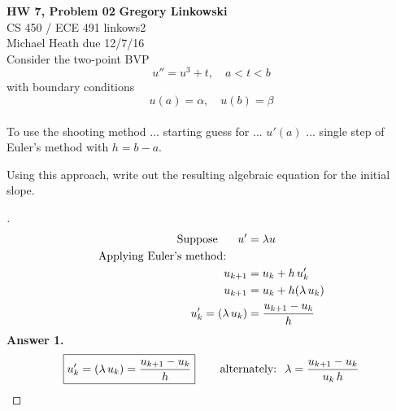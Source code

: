 \documentclass[12pt]{article}
\newenvironment{exercise}[2][Exercise]{\begin{trivlist}
\item[\hskip \labelsep {\bfseries #1}\hskip \labelsep {\bfseries #2.}]}{\end{trivlist}}
\begin{document}
\noindent
\large\textbf{HW 7, Problem 02} \hfill \textbf{Gregory Linkowski} \\
\normalsize CS 450 / ECE 491 \hfill linkows2 \\
Michael Heath \hfill due 12/7/16 \\


\vspace{5mm}
Consider the two-point BVP
\[ u'' = u^3 + t, \quad a < t < b \]
with boundary conditions
\[ u(a) = \alpha, \quad u(b) = \beta \] \\
To use the shooting method ... starting guess for ... $u'(a)$ ... single step of Euler's method with $h = b - a$.
\vspace{-2mm} \\

\vspace{5mm}
\begin{exercise}{1}
	Using this approach, write out the resulting algebraic equation for the initial slope.
\end{exercise} \vspace{-10mm}
\begin{proof}[]
	\begin{align*}
		\textnormal{Suppose \hspace{5mm}} u' &= \lambda u \\
		\textnormal{Applying Euler's method: \hspace{5mm}} & \\
		u_{k+1} &= u_k + h \, u_k'\\
		u_{k+1} &= u_k + h(\lambda \, u_k) \\
		u_k' = (\lambda \, u_k) &= \frac{u_{k+1} - u_k}{h} \\
	\end{align*}
	\textbf{Answer 1.} \vspace{-7mm} \\
		\[ \boxed{u_k' = (\lambda \, u_k) = \frac{u_{k+1} - u_k}{h}} \quad \textnormal{ \hspace{3mm}alternately: \hspace{1mm}} \lambda = \frac{u_{k+1} - u_k}{u_k \, h} \]
\end{proof}
\end{document}

